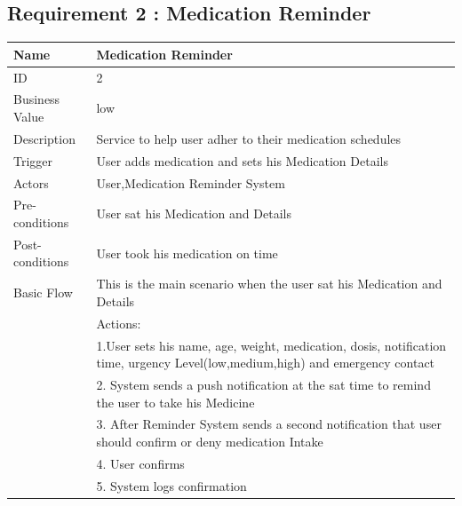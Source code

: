 \documentclass{article}
\begin{document}
\clearpage


\subsection{Requirement 2 : Medication Reminder}


\begin{table}[h!]
    \begin{tabularx}{\textwidth}{|>{\raggedright\arraybackslash}p{}|X|}
        \hline
        Name             & Medication Reminder                                \\ \hline
        ID               & 2                                                                                     \\ \hline
        Business Value   & low                                                                                  \\ \hline
        Description      & Service to help user adher to their medication schedules  \\ \hline
        Trigger          & User adds medication and sets his Medication Details\\ \hline
        Actors           & User,Medication Reminder System                               \\ \hline
        Pre-conditions   & User sat his Medication and Details                                    \\ \hline
        Post-conditions  & User took his medication on time                                                   \\ \hline
        Basic Flow       & This is the main scenario when the user sat his Medication and Details \\ \hline
                         & Actions: \\
                         & 1.User sets his name, age, weight, medication, dosis, notification time, urgency Level(low,medium,high) and emergency contact\\
                         & 2. System sends a push notification at the sat time to remind the user to take his Medicine \\
                         & 3. After Reminder System sends a second notification that user should confirm or deny medication Intake\\
                         & 4. User confirms \\
                         & 5. System logs confirmation \\ \hline

\end{tabularx}
\end{table}
\end{document}
